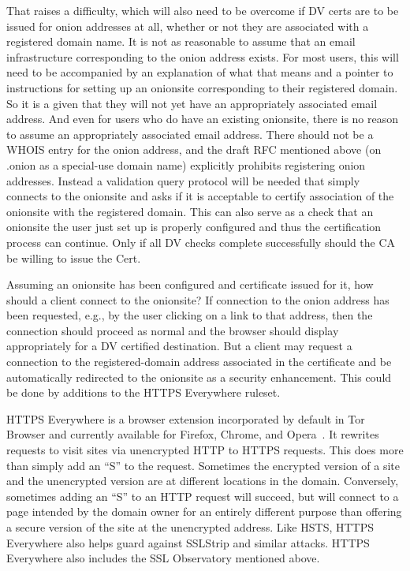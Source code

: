 \documentclass[10pt, conference, compsocconf]{styles/IEEEtran}
\begin{document}
That raises a difficulty, which will also need to be overcome if DV
certs are to be issued for onion addresses at all, whether or not they
are associated with a registered domain name.  It is not as reasonable
to assume that an email infrastructure corresponding to the onion
address exists. For most users, this will need to be accompanied by an
explanation of what that means and a pointer to instructions for
setting up an onionsite corresponding to their registered domain. So
it is a given that they will not yet have an appropriately associated
email address.  And even for users who do have an existing onionsite,
there is no reason to assume an appropriately associated email
address. There should not be a WHOIS entry for the onion address, and
the draft RFC mentioned above (on .onion as a special-use domain name)
explicitly prohibits registering onion addresses.  Instead a
validation query protocol will be needed that simply connects to the
onionsite and asks if it is acceptable to certify association of the
onionsite with the registered domain.  This can also serve as a check
that an onionsite the user just set up is properly configured and thus
the certification process can continue.  Only if all DV checks
complete successfully should the CA be willing to issue the Cert.


Assuming an onionsite has been configured and certificate issued for
it, how should a client connect to the onionsite? If connection
to the onion address has been requested, e.g., by the user
clicking on a link to that address, then the connection should
proceed as normal and the browser should display appropriately for a
DV certified destination. But a client may request a connection
to the registered-domain address associated in the certificate
and be automatically redirected to the onionsite as a security
enhancement. This could be done by additions to the HTTPS Everywhere
ruleset.

HTTPS Everywhere is a browser extension incorporated by default in Tor
Browser and currently available for Firefox, Chrome, and
Opera~\cite{https-everywhere}. It rewrites requests to visit sites via
unencrypted HTTP to HTTPS requests. This does more than simply add an
``S'' to the request. Sometimes the encrypted version of a site and
the unencrypted version are at different locations in the domain.
Conversely, sometimes adding an ``S'' to an HTTP request will
succeed, but will connect to a page intended by the domain owner for an
entirely different purpose than offering a secure version of the site
at the unencrypted address.  Like HSTS, HTTPS Everywhere also helps
guard against SSLStrip and similar attacks. HTTPS Everywhere
also includes the SSL Observatory mentioned above.
\end{document}
